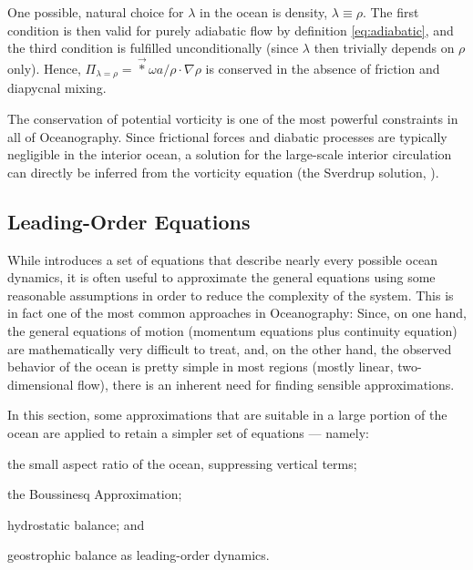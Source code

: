 %
One possible, natural choice for \(\lambda\) in the ocean is density, \ie \(\lambda \equiv \rho\). The first condition is then valid for purely adiabatic flow by definition \eqref{eq:adiabatic}, and the third condition is fulfilled unconditionally (since \(\lambda\) then trivially depends on \(\rho\) only). Hence, \(\Pi_{\lambda = \rho} = \vec*{\omega}{a} / \rho \cdot \nabla \rho\) is conserved in the absence of friction and diapycnal mixing.

\parabreak

The conservation of potential vorticity is one of the most powerful constraints in all of Oceanography. Since frictional forces and diabatic processes are typically negligible in the interior ocean, a solution for the large-scale interior circulation can directly be inferred from the vorticity equation (the Sverdrup solution, \cf {}).

\subsection{Leading-Order Equations}
\label{sec:leadingorder}
While  introduces a set of equations that describe nearly every possible ocean dynamics, it is often useful to approximate the general equations using some reasonable assumptions in order to reduce the complexity of the system. This is in fact one of the most common approaches in Oceanography: Since, on one hand, the general equations of motion (momentum equations plus continuity equation) are mathematically very difficult to treat, and, on the other hand, the observed behavior of the ocean is pretty simple in most regions (mostly linear, two-dimensional flow), there is an inherent need for finding sensible approximations.

In this section, some approximations that are suitable in a large portion of the ocean are applied to retain a simpler set of equations --- namely:
\begin{items}
	\item the small aspect ratio of the ocean, suppressing vertical terms;
	\item the Boussinesq Approximation;
	\item hydrostatic balance; and
	\item geostrophic balance as leading-order dynamics.
\end{items}

